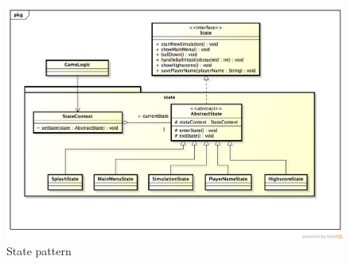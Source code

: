 \documentclass[fontsize=12pt,
               paper=a4,
               twoside=false,
               parskip=half,
               ]{scrartcl}
\begin{document}
\begin{figure}[h!]
	\centering
	\includegraphics[width=15.5cm]{./img/state-pattern.png}
	\caption[State pattern]{State pattern}
	\label{fig:state_pattern}
\end{figure}
\end{document}
